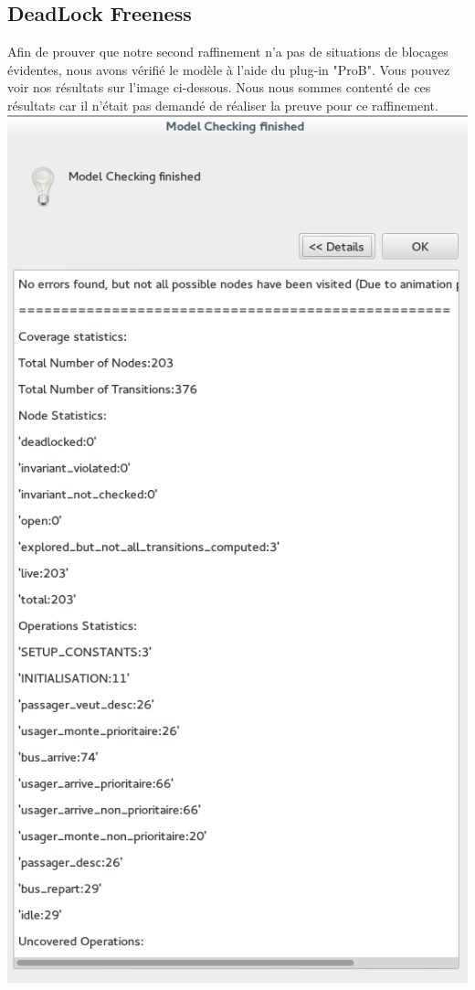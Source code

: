 \documentclass[a4paper,titlepage]{report}
\begin{document}
\subsection{DeadLock Freeness}
	Afin de prouver que notre second raffinement n'a pas de situations de blocages évidentes, nous avons vérifié le modèle à l'aide du plug-in "ProB". Vous pouvez voir nos résultats sur l'image ci-dessous. Nous nous sommes contenté de ces résultats car il n'était pas demandé de réaliser la preuve pour ce raffinement. \\
	
	\includegraphics[scale=0.8]{checkMachineBus2.png}
\end{document}
